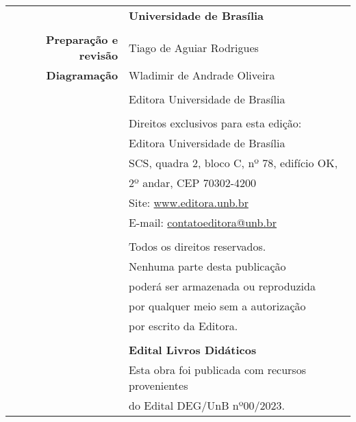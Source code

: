 \thispagestyle{empty}

\begin{center}

\begin{tabular}{r:l}
						& \textbf{\Large Universidade de Brasília}				\\
						&														\\
	{\bf Preparação e revisão} 		& Tiago de Aguiar Rodrigues					\\
	{\bf Diagramação}				& Wladimir de Andrade Oliveira				\\
						&														\\
						&  Editora Universidade de Brasília	\\
						&														\\
						& Direitos exclusivos para esta edição:					\\
						&	Editora Universidade de Brasília					\\
						&	SCS, quadra 2, bloco C, nº 78, edifício OK,			\\
						&	2º andar, CEP 70302-4200							\\
						&	Site: \url{www.editora.unb.br}						\\
						&	E-mail: \href{mailto:contatoeditora@unb.br}{contatoeditora@unb.br}	\\							&																	\\
						& Todos os direitos reservados. \\
						& Nenhuma parte desta publicação	\\														& poderá ser armazenada ou reproduzida \\
						& por qualquer meio sem a autorização \\
						& por escrito da Editora. \\
						&		\\
						& {\bf Edital Livros Didáticos}	\\
						& Esta obra foi publicada com recursos provenientes	\\
						& do Edital DEG/UnB nº00/2023.
\end{tabular}

\end{center}

\newpage
